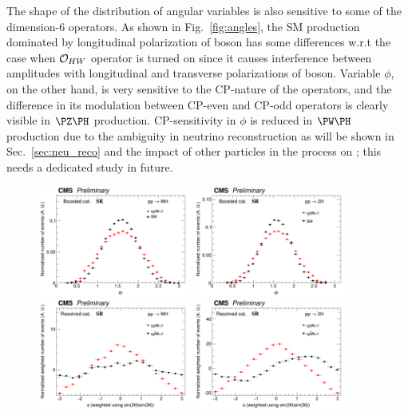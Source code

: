 \documentclass[a4paper,11pt]{article}
\begin{document}
The shape of the distribution of angular variables is also sensitive to some of the dimension-6 operators. As shown in Fig.~\ref{fig:angles}, 
the SM production dominated by longitudinal polarization of \PW boson has some differences w.r.t the case when ${\cal O}_{HW}$  operator is turned on since it causes interference between amplitudes with longitudinal and transverse polarizations of \PW boson. 
Variable $\phi$, on the other hand, is very sensitive to the CP-nature of the operators, and the difference in its modulation between CP-even and CP-odd operators is clearly visible in $\PZ\PH$ production. CP-sensitivity in $\phi$ is reduced in $\PW\PH$ production due to the ambiguity in neutrino reconstruction as will be shown in Sec.~\ref{sec:neu_reco} and the impact of other particles in the process on \ptmiss; this needs a dedicated study in future.
\begin{figure}[hbtp]
\begin{center}
\includegraphics[width=0.45\textwidth]{Figures/RECO/Angle/WH/Boosted_Plot_Theta.png}
\includegraphics[width=0.45\textwidth]{Figures/RECO/Angle/ZH/Boosted_Plot_Theta.png}
\includegraphics[width=0.45\textwidth]{Figures/RECO/CP/WH/Resolved_Plot_phi.png}
\includegraphics[width=0.45\textwidth]{Figures/RECO/CP/ZH/Resolved_Plot_phi.png}

\end{center}
\end{figure}
\end{document}
